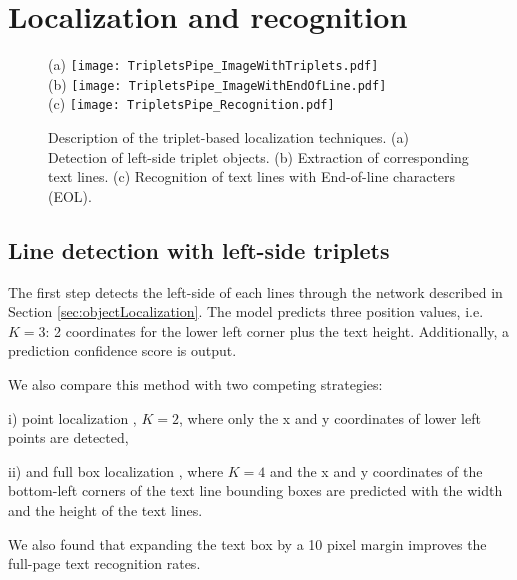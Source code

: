 \documentclass[conference]{IEEEtran}
\begin{document}
\section{Localization and recognition}

\begin{figure}[!t]
  \centering
  \small{(a)} \texttt{[image: TripletsPipe\_ImageWithTriplets.pdf]} \\
  \small{(b)} \texttt{[image: TripletsPipe\_ImageWithEndOfLine.pdf]} \\
  \small{(c)} \texttt{[image: TripletsPipe\_Recognition.pdf]}
  \caption{Description of the triplet-based localization techniques. (a) Detection of left-side triplet objects. (b) Extraction of corresponding text lines. (c) Recognition of text lines with End-of-line characters (EOL).}
  \label{fig:triplets}
\end{figure}

\subsection{Line detection with left-side triplets}
\label{sec:triplets}
The first step detects the left-side of each lines through the network described in Section \ref{sec:objectLocalization}. The model predicts three position values, i.e. $K{=}3$: 2 coordinates for the lower left corner plus the text height. Additionally, a prediction confidence score is output.

We also compare this method with two competing strategies: 

i) point localization \cite{moysset2016points}, $K{=}2$, where only the x and y coordinates of lower left points are detected, 

ii) and full box localization \cite{moysset2016learning}, where $K{=}4$ and the x and y coordinates of the bottom-left corners of the text line bounding boxes are predicted with the width and the height of the text lines. 

We also found that expanding the text box by a 10 pixel margin 
improves the full-page text recognition rates. 

\end{document}

